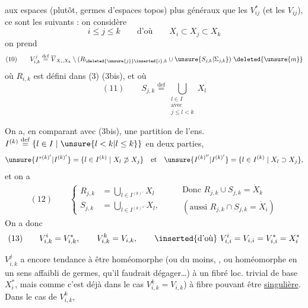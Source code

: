 aux espaces (plutôt, germes d'espaces  topos)  plus généraux que les $V_{ij}^*$ (et les $V_{ij}$), ce sont les suivants : on considère
\[
i\leq j\leq k\qquad\text{d'où}\qquad X_i\subset X_j\subset X_k
\]
on prend
\[
(10)\qquad V_{i,k}^j\overset{\mathrm{def}}=\overline V_{X_i,X_k}\setminus(R_{\deleted{\unsure{j}}\inserted{i},k}\cup\unsure{S_{j,k}|\Sigma_{j,k}})\ \deleted{\unsure{m}}
\]
où $R_{i,k}$ est défini dans (3) (3bis), et où
\[
(11)\qquad S_{j,k}\overset{\mathrm{def}}=\bigcup_{\substack{l\in I\\\text{avec}\\j\leq l<k}}X_l
\]

On a, en comparant avec (3bis), une partition de l'ens. $I^{(k)}\overset{\mathrm{def}}=\{l\in I\mid\unsure{l<k|l\leq k}\}$ en deux parties,
\[
\unsure{I^{*(k)'}|I^{(k)'}}=\{l\in I^{(k)}\mid X_l\not\supset X_j\}\quad\text{et}\quad
\unsure{I^{(k)''}|I^{(k)'}}=\{l\in I^{(k)}\mid X_l\supset X_j\},
\]
et on a
\[
(12)\qquad\left\{\begin{aligned}
R_{j,k}&=\bigcup_{l\in I^{(k)'}}X_l\\
S_{j,k}&=\bigcup_{l\in I^{(k)''}}X_l,
\end{aligned}\right.
\qquad\begin{gathered}
\text{Donc }R_{j,k}\cup S_{j,k}=\dot X_k\\
(\text{aussi }R_{j,k}\cap S_{j,k}=\dot X_i)
\end{gathered}
\]
 On a donc
\[
(13)\qquad V_{i,k}^i=V_{i,k}^*,\qquad V_{i,k}^k=V_{i,k},\qquad\text{\inserted{d'où}}\ V_{i,i}^i=V_{i,i}=V_{i,i}^*=X_i^*
\]

$V_{i,k}^j$ a encore tendance à être  homéomorphe (ou du moins, , ou homéomorphe en un sens affaibli de germes, qu'il faudrait dégager\ldots) à un fibré loc. trivial de base $X_i^*$, mais comme c'est déjà dans le cas $V_{i,k}^k=V_{i,k}$) à fibre pouvant être \uline{singulière}. Dans le cas de $V_{i,k}^k$,
